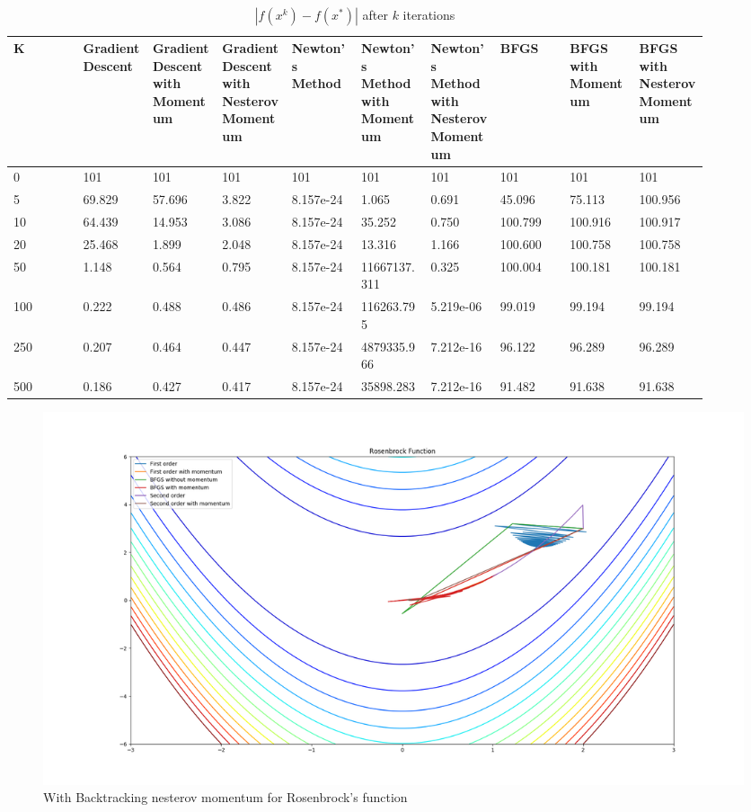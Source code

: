 \documentclass{article}
\begin{document}
\begin{table}[H]
	\centering
	\caption{$ | f(x^k) - f(x^*) | $ after $k$ iterations}
	\label{Rosenbrock's function table}
	\begin{tabular}{|l|p{0.1\linewidth}|p{0.1\linewidth}|p{0.1\linewidth}|p{0.1\linewidth}|p{0.1\linewidth}|p{0.1\linewidth}|p{0.1\linewidth}|p{0.1\linewidth}|p{0.1\linewidth}|}
		\hline
		K & Gradient Descent & Gradient Descent with Momentum & Gradient Descent with Nesterov Momentum & Newton's Method & Newton's Method with Momentum & Newton's Method with Nesterov Momentum & BFGS & BFGS with Momentum & BFGS with Nesterov Momentum \\
		\hline
		0 & 101 & 101 & 101 & 101 & 101 & 101 & 101 & 101 & 101 \\
		\hline
		5 & 69.829 & 57.696 & 3.822 & 8.157e-24 & 1.065 & 0.691 & 45.096 & 75.113 & 100.956 \\
		\hline
		10 & 64.439 & 14.953 & 3.086 & 8.157e-24 & 35.252 & 0.750 & 100.799 & 100.916 & 100.917 \\
		\hline
		20 & 25.468 & 1.899 & 2.048 & 8.157e-24 & 13.316 & 1.166 & 100.600 & 100.758 & 100.758 \\
		\hline
		50 & 1.148 & 0.564 & 0.795 & 8.157e-24 & 11667137.311 & 0.325 & 100.004 & 100.181 & 100.181 \\
		\hline
		100 & 0.222 & 0.488 & 0.486 & 8.157e-24 & 116263.795 & 5.219e-06 & 99.019 & 99.194 & 99.194 \\
		\hline
		250 & 0.207 & 0.464 & 0.447 & 8.157e-24 & 4879335.966 & 7.212e-16 & 96.122 & 96.289 & 96.289 \\
		\hline
		500 & 0.186 & 0.427 & 0.417 & 8.157e-24 & 35898.283 & 7.212e-16 & 91.482 & 91.638 & 91.638 \\
		\hline
	\end{tabular}
\end{table}

\begin{figure}[H]
	\includegraphics[width=\linewidth]{../Images/rosenbrockbacktrack.png}
	\caption{With Backtracking nesterov momentum for Rosenbrock's function}
	\label{fig:With Backtracking nesterov momentum for Rosenbrock's function}
\end{figure}
\end{document}
